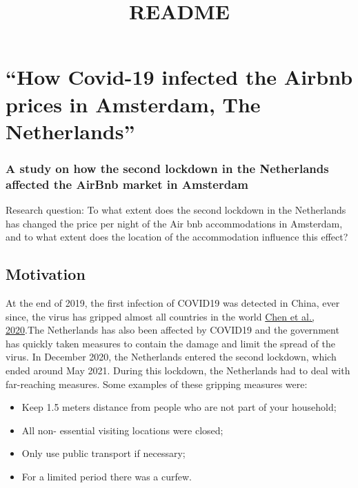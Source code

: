 \documentclass[
]{article}
\title{README}
\author{}
\date{\vspace{-2.5em}}
\providecommand{\tightlist}{%
  \setlength{\itemsep}{0pt}\setlength{\parskip}{0pt}}
\begin{document}
\maketitle

\hypertarget{how-covid-19-infected-the-airbnb-prices-in-amsterdam-the-netherlands}{%
\section{``How Covid-19 infected the Airbnb prices in Amsterdam, The
Netherlands''}\label{how-covid-19-infected-the-airbnb-prices-in-amsterdam-the-netherlands}}

\hypertarget{a-study-on-how-the-second-lockdown-in-the-netherlands-affected-the-airbnb-market-in-amsterdam}{%
\subsubsection{A study on how the second lockdown in the Netherlands
affected the AirBnb market in
Amsterdam}\label{a-study-on-how-the-second-lockdown-in-the-netherlands-affected-the-airbnb-market-in-amsterdam}}

Research question: To what extent does the second lockdown in the
Netherlands has changed the price per night of the Air bnb
accommodations in Amsterdam, and to what extent does the location of the
accommodation influence this effect?

\hypertarget{motivation}{%
\subsection{Motivation}\label{motivation}}

At the end of 2019, the first infection of COVID19 was detected in
China, ever since, the virus has gripped almost all countries in the
world
\href{https://www.frontiersin.org/articles/10.3389/fcell.2020.00476/full}{Chen
et al., 2020}.The Netherlands has also been affected by COVID19 and the
government has quickly taken measures to contain the damage and limit
the spread of the virus. In December 2020, the Netherlands entered the
second lockdown, which ended around May 2021. During this lockdown, the
Netherlands had to deal with far-reaching measures. Some examples of
these gripping measures were:

\begin{itemize}
\tightlist
\item
  Keep 1.5 meters distance from people who are not part of your
  household;
\item
  All non- essential visiting locations were closed;
\item
  Only use public transport if necessary;
\item
  For a limited period there was a curfew.
\end{itemize}
\end{document}
